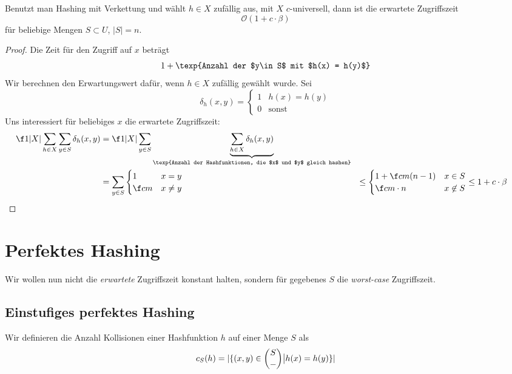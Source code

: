 \documentclass{mycourse}
\renewcommand{\O}{\mathcal{O}}
\begin{document}
\begin{st}
	Benutzt man Hashing mit Verkettung und wählt $h\in X$ zufällig aus, mit $X$ $c$-universell,
	dann ist die erwartete Zugriffszeit
	\[
		\O(1+c\cdot \beta)
	\]
	für beliebige Mengen $S\subset U$, $|S|=n$.
	\begin{proof}
		Die Zeit für den Zugriff auf $x$ beträgt
		\[
			1 + \texp{Anzahl der $y\in S$ mit $h(x) = h(y)$}
		\]
		Wir berechnen den Erwartungswert dafür, wenn $h\in X$ zufällig gewählt wurde.
		Sei
		\[
			\delta_h  (x,y) = \begin{cases}1 & h(x) = h(y)\\ 0& \text{sonst}\end{cases}
		\]
		Uns interessiert für beliebiges $x$ die erwartete Zugriffszeit:
		\begin{align*}
			\f 1{|X|}\sum_{h\in X} \sum_{y\in S} \delta_h(x,y) &= 
			\f 1{|X|}\sum_{y\in S} \underbrace{\sum_{h\in X} \delta_h(x,y)}_{\texp{Anzahl der Hashfunktionen, die $x$ und $y$ gleich hashen}} \\
			&= \sum_{y\in S} \begin{cases} 1 & x=y \\ \f cm & x\neq y\end{cases}
			&\le  \begin{cases} 1 + \f cm (n-1) & x\in S\\ \f cm\cdot n & x\not \in S\end{cases}
			&\le 1 + c\cdot \beta
		\end{align*}
	\end{proof}
\end{st}


\section{Perfektes Hashing}

Wir wollen nun nicht die \emph{erwartete} Zugriffszeit konstant halten, sondern für gegebenes $S$ die \emph{worst-case} Zugriffszeit.

\subsection{Einstufiges perfektes Hashing}

\begin{df}
	Wir definieren die Anzahl Kollisionen einer Hashfunktion $h$ auf einer Menge $S$ als
	\[
		c_S(h) = |\{(x,y) \in \binom{S}{\--} \big| h(x)=h(y)\}|
	\]
\end{df}
\end{document}
